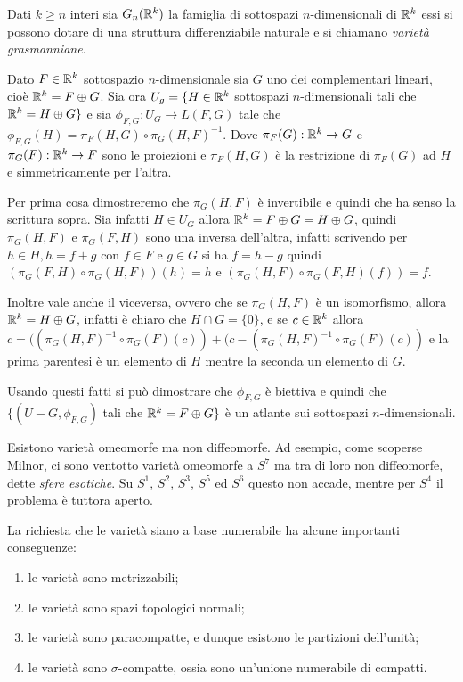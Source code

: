 \begin{example}
 Dati $k \geq n$ interi sia $G_n(\mathbb R^k)$ la famiglia di sottospazi $n$-dimensionali di $\mathbb R^k$ essi si possono dotare 
 di una struttura differenziabile naturale e si chiamano \emph{varietà grasmanniane}. 
 
 Dato $F \in \mathbb R^k$ sottospazio $n$-dimensionale sia $G$ uno dei complementari lineari, cioè $\mathbb R^k=F \oplus G$.
 Sia ora $U_g=\{H\in \mathbb R^k$ sottospazi $n$-dimensionali tali che $\mathbb R^k=H \oplus G\}$ e sia
 $\phi_{F,G}:U_G \to L(F,G)$ tale che $\phi_{F,G}(H)=\pi_F(H,G) \circ \pi_G(H,F)^{-1}$. Dove
 $\pi_F(G):\mathbb R^k \to G$ e $\pi_G(F):\mathbb R^k \to F$ sono le proiezioni e $\pi_F(H,G)$ è la restrizione di $\pi_F(G)$ ad $H$
 e simmetricamente per l'altra. 
 
 Per prima cosa dimostreremo che $\pi_G(H,F)$ è invertibile e quindi che ha senso la scrittura sopra.
 Sia infatti $H \in U_G$ allora $\mathbb R^k=F \oplus G=H \oplus G$, quindi $\pi_G(H,F)$ e $\pi_G(F,H)$ sono una inversa dell'altra, infatti scrivendo
 per $h \in H, h=f+g$ con $f \in F$ e $g \in G$ si ha $f=h-g$ quindi $(\pi_G(F,H) \circ \pi_G(H,F))(h)=h$ e 
 $(\pi_G(H,F) \circ \pi_G(F,H)(f))=f$.
 
 Inoltre vale anche il viceversa, ovvero che se $\pi_G(H,F)$ è un isomorfismo, allora $\mathbb R^k=H \oplus G$, infatti
 è chiaro che $H \cap G=\{0\}$, e se $c \in \mathbb R^k$ allora $c=((\pi_G(H,F)^{-1} \circ \pi_G(F)(c))+(c-(\pi_G(H,F)^{-1} \circ \pi_G(F)(c))$ e la prima parentesi
 è un elemento di $H$ mentre la seconda un elemento di $G$.
 
 Usando questi fatti si può dimostrare che $\phi_{F,G}$ è biettiva e quindi che $\{(U-G,\phi_{F,G})$ tali che $\mathbb R^k=F \oplus G \}$ è 
 un atlante sui sottospazi $n$-dimensionali.
 
 \end{example}

 
 \begin{remark}
  Esistono varietà omeomorfe ma non diffeomorfe. Ad esempio, come scoperse Milnor, ci sono ventotto varietà
  omeomorfe a $S^7$ ma tra di loro non diffeomorfe, dette \emph{sfere esotiche}. Su $S^1$, $S^2$, $S^3$, $S^5$
  ed $S^6$ questo non accade, mentre per $S^4$ il problema è tuttora aperto.
 \end{remark}
 
 \begin{remark}
  La richiesta che le varietà siano a base numerabile ha alcune importanti conseguenze:
  \begin{enumerate}
   \item le varietà sono metrizzabili;
   \item le varietà sono spazi topologici normali;
   \item le varietà sono paracompatte, e dunque esistono le partizioni dell'unità;
   \item le varietà sono $\sigma$-compatte, ossia sono un'unione numerabile di compatti.
  \end{enumerate}
 \end{remark}

